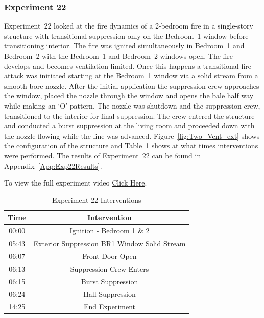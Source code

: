 \documentclass[12pt,oneside]{book}
\begin{document}
\FloatBarrier

\subsubsection{Experiment 22}
Experiment~22 looked at the fire dynamics of a 2-bedroom fire in a single-story structure with transitional suppression only on the Bedroom~1 window before transitioning interior. The fire was ignited simultaneously in Bedroom~1 and Bedroom~2 with the Bedroom~1 and Bedroom~2 windows open. The fire develops and becomes ventilation limited. Once this happens a transitional fire attack was initiated starting at the Bedroom~1 window via a solid stream from a smooth bore nozzle. After the initial application the suppression crew approaches the window, placed the nozzle through the window and opens the bale half way while making an `O' pattern. The nozzle was shutdown and the suppression crew, transitioned to the interior for final suppression. The crew entered the structure and conducted a burst suppression at the living room and proceeded down with the nozzle flowing while the line was advanced. Figure~\ref{fig:Two_Vent_ext} shows the configuration of the structure and Table~\ref{Table:Exp22Interventions} shows at what times interventions were performed. The results of Experiment~22 can be found in Appendix~\ref{App:Exp22Results}. 

To view the full experiment video \href{https://player.vimeo.com/video/170499624?autoplay=1}{Click Here}.

\begin{table}[H]
	\centering
	\caption{Experiment 22 Interventions}
	\begin{tabular}{|c|c|} 
		\hline
		Time & Intervention \\ \hline \hline
		00:00 & Ignition - Bedroom 1 \& 2 \\ \hline
		05:43 & Exterior Suppression BR1 Window Solid Stream \\ \hline
		06:07 & Front Door Open \\ \hline
		06:13 & Suppression Crew Enters\\ \hline
		06:15 & Burst Suppression \\ \hline 
		06:24 & Hall Suppression \\ \hline
		14:25 & End Experiment\\ \hline
	\end{tabular}
	\label{Table:Exp22Interventions}
\end{table}
\end{document}
